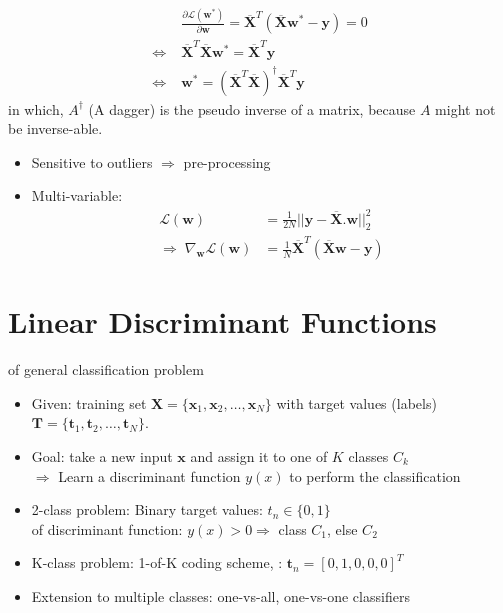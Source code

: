 \begin{align}
	&\frac{\partial\mathcal{L}(\textbf{w}^*)}{\partial\textbf{w}} = \overline{\textbf{X}}^T \left( \overline{\textbf{X}} \textbf{w}^* - \textbf{y} \right) = 0 \\
	\Leftrightarrow \; &\overline{\textbf{X}}^T\overline{\textbf{X}}\textbf{w}^* = \overline{\textbf{X}}^T \textbf{y} \\
	\Leftrightarrow \; &\textbf{w}^* = \left( \overline{\textbf{X}}^T \overline{\textbf{X}} \right)^\dagger \overline{\textbf{X}}^T \textbf{y}
\end{align}
in which, $A^\dagger$ (A dagger) is the pseudo inverse of a matrix, because $A$ might not be inverse-able. {\color{red} }\\

\note
\begin{itemize}
	\item Sensitive to outliers $\Rightarrow$ pre-processing
	\item Multi-variable:
	\begin{align*}
		\mathcal{L}(\textbf{w}) &= \frac{1}{2N} ||\textbf{y}-\overline{\textbf{X}}.\textbf{w}||^2_2 \\
		\Rightarrow\; \nabla_\textbf{w}\mathcal{L}(\textbf{w}) &= \frac{1}{N} \overline{\textbf{X}}^T (\overline{\textbf{X}}\textbf{w}-\textbf{y})
	\end{align*}
\end{itemize}
\section{Linear Discriminant Functions}
\label{sec:linear-classification}
 of general classification problem
\begin{itemize}
	\item Given: training set $\textbf{X} = \{\textbf{x}_1, \textbf{x}_2, \dots, \textbf{x}_N\}$ with target values (labels) $\textbf{T} = \{\textbf{t}_1, \textbf{t}_2, \dots, \textbf{t}_N\}$.
	\item Goal: take a new input $\textbf{x}$ and assign it to one of $K$ classes $C_k$\\
	$\Rightarrow$ Learn a discriminant function $y(x)$ to perform the classification
\end{itemize}
\begin{itemize}
	\item 2-class problem: Binary target values: $t_n \in \{0, 1\}$\\
	\Eg of discriminant function: $y(x) > 0 \Rightarrow$ class $C_1$, else $C_2$
	\item K-class problem: 1-of-K coding scheme, \eg: $\textbf{t}_n = [0, 1, 0, 0, 0]^T$
	\item Extension to multiple classes: one-vs-all, one-vs-one classifiers
\end{itemize}
